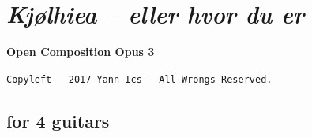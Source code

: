 \newpage

{}
\thispagestyle{empty}

\section*{\textsl{Kj{\o}lhiea -- eller hvor du er}}
\label{kjcccc}

\begin{center} 
\textbf{Open Composition Opus 3}

{\scriptsize  \texttt{Copyleft \textcopyleft \, 2017 Yann Ics - All Wrongs Reserved.}}
 \end{center} 
 
\subsection*{\quad for 4 guitars}
\label{kjccqg}
\label{kj}

\vspace{-5mm}

